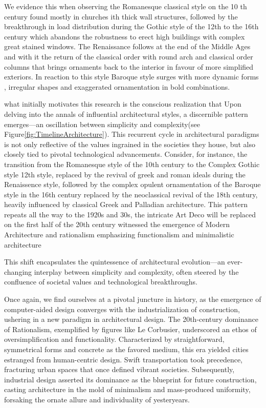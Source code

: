 We evidence this when observing the Romanesque classical style on the 10 th century found mostly in churches ith thick wall structures, followed by the breakthrough in load distribution during the Gothic style of the 12th to the 16th century which abandons the robustness to erect high buildings with complex great stained windows.
The Renaissance follows at the end of the Middle Ages and with it the return of the classical order with round arch and classical order columns that brings ornaments back to the interior in favour of more simplified exteriors.
In reaction to this style Baroque style surges with more dynamic forms , irregular shapes and exaggerated ornamentation in bold combinations.

what initially motivates this research is the conscious realization that
Upon delving into the annals of influential architectural styles, a discernible pattern emerges—an oscillation between simplicity and complexity(see Figure\ref{fig:TimelineArchitecture}).
This recurrent cycle in architectural paradigms is not only reflective of the values ingrained in the societies they house, but also closely tied to pivotal technological advancements.
Consider, for instance, the transition from the Romanesque style of the 10th century to the Complex Gothic style 12th style, replaced by the revival of greek and roman ideals during the Renaissence style, followed by the complex opulent ornamentation of the Baroque style in the 16th century replaced by the neoclassical revival of the 18th century, heavily influenced by classical Greek and Palladian architecture\cite{Arora2023}.
This pattern repeats all the way to the 1920s and 30s, the intricate Art Deco will be replaced on the first half of the 20th century witnessed the emergence of Modern Architecture and rationalism emphasizing functionalism and minimalistic architecture




This shift encapsulates the quintessence of architectural evolution—an ever-changing interplay between simplicity and complexity, often steered by the confluence of societal values and technological breakthroughs.


Once again, we find ourselves at a pivotal juncture in history, as the emergence of computer-aided design converges with the industrialization of construction, ushering in a new paradigm in architectural design.
The 20th-century dominance of Rationalism, exemplified by figures like Le Corbusier, underscored an ethos of oversimplification and functionality.
Characterized by straightforward, symmetrical forms and concrete as the favored medium, this era yielded cities estranged from human-centric design.
Swift transportation took precedence, fracturing urban spaces that once defined vibrant societies\cite{Stacbond2020}.
Subsequently, industrial design asserted its dominance as the blueprint for future construction\cite{Economakis2023}, casting architecture in the mold of minimalism and mass-produced uniformity, forsaking the ornate allure and individuality of yesteryears.

